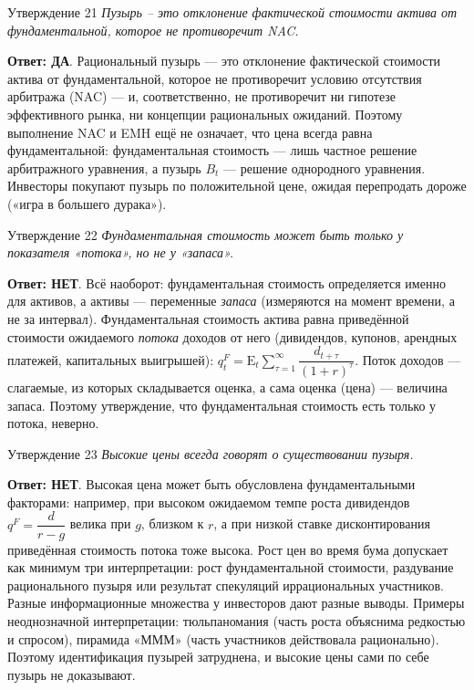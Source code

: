 \documentclass[10pt,a4paper]{article}
\newcommand{\qda}{\textbf{\color{yesgreen}Ответ: ДА}}
\newcommand{\qnet}{\textbf{\color{nored}Ответ: НЕТ}}
\newenvironment{answer}[2]{%
  \begin{qbox}{Утверждение #1}
  \textit{#2}\par\smallskip
}{%
  \end{qbox}\vspace{2pt}
}
\begin{document}
\begin{answer}{21}{Пузырь -- это отклонение фактической стоимости актива от фундаментальной, которое не противоречит NAC.}
\qda. Рациональный пузырь --- это отклонение фактической стоимости актива от фундаментальной, которое не противоречит условию отсутствия арбитража (NAC) --- и, соответственно, не противоречит ни гипотезе эффективного рынка, ни концепции рациональных ожиданий. Поэтому выполнение NAC и EMH ещё не означает, что цена всегда равна фундаментальной: фундаментальная стоимость --- лишь частное решение арбитражного уравнения, а пузырь $B_t$ --- решение однородного уравнения. Инвесторы покупают пузырь по положительной цене, ожидая перепродать дороже («игра в большего дурака»).
\end{answer}

\begin{answer}{22}{Фундаментальная стоимость может быть только у показателя «потока», но не у «запаса».}
\qnet. Всё наоборот: фундаментальная стоимость определяется именно для активов, а активы --- переменные \emph{запаса} (измеряются на момент времени, а не за интервал). Фундаментальная стоимость актива равна приведённой стоимости ожидаемого \emph{потока} доходов от него (дивидендов, купонов, арендных платежей, капитальных выигрышей): $q^F_t=\mathrm{E}_t\sum_{\tau=1}^\infty\dfrac{d_{t+\tau}}{(1+r)^\tau}$. Поток доходов --- слагаемые, из которых складывается оценка, а сама оценка (цена) --- величина запаса. Поэтому утверждение, что фундаментальная стоимость есть только у потока, неверно.
\end{answer}

\begin{answer}{23}{Высокие цены всегда говорят о существовании пузыря.}
\qnet. Высокая цена может быть обусловлена фундаментальными факторами: например, при высоком ожидаемом темпе роста дивидендов $q^F=\dfrac{d}{r-g}$ велика при $g$, близком к $r$, а при низкой ставке дисконтирования приведённая стоимость потока тоже высока. Рост цен во время бума допускает как минимум три интерпретации: рост фундаментальной стоимости, раздувание рационального пузыря или результат спекуляций иррациональных участников. Разные информационные множества у инвесторов дают разные выводы. Примеры неоднозначной интерпретации: тюльпаномания (часть роста объяснима редкостью и спросом), пирамида «МММ» (часть участников действовала рационально). Поэтому идентификация пузырей затруднена, и высокие цены сами по себе пузырь не доказывают.
\end{answer}
\end{document}
